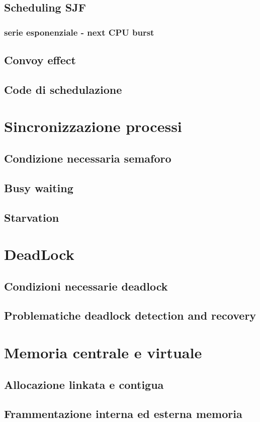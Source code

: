 \documentclass{report}
\begin{document}
\subsection{Scheduling SJF}
\subsubsection{serie esponenziale - next CPU burst}
\subsection{Convoy effect}
\subsection{Code di schedulazione}
\section{Sincronizzazione processi}
\subsection{Condizione necessaria semaforo}
\subsection{Busy waiting}
\subsection{Starvation}
\section{DeadLock}
\subsection{Condizioni necessarie deadlock}
\subsection{Problematiche deadlock detection and recovery}
\section{Memoria centrale e virtuale}
\subsection{Allocazione linkata e contigua}
\subsection{Frammentazione interna ed esterna memoria}
\end{document}
